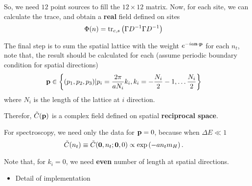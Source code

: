 So, we need $12$ point sources to fill the $12\times 12$ matrix. Now, for each site, we can calculate the trace, and obtain a \textbf{real} field defined on sites
\begin{equation}
\begin{split}
&\Phi (n) = {\rm tr}_{c,s}\left(\Gamma D^{-1}\Gamma D^{-1}\right)
\end{split}
\end{equation}

The final step is to sum the spatial lattice with the weight $e^{-ia{\bf n}\cdot {\bf p}}$ for each $n_t$, note that, the result should be calculated for each (assume periodic boundary condition for spatial directions)
\begin{equation}
\begin{split}
&{\bf p}\in \left\{(p_1,p_2,p_3)|p_i=\frac{2\pi}{a N_i}k_i, k_i=-\frac{N_i}{2}-1,\ldots \frac{N_i}{2}\right\}
\end{split}
\end{equation}
where $N_i$ is the length of the lattice at $i$ direction.

Therefor, $\tilde{C}({\bf p})$ is a complex field defined on spatial \textbf{reciprocal space}.

For spectroscopy, we need only the data for ${\bf p}=0$, because when $\Delta E\ll 1$
\begin{equation}
\begin{split}
&\tilde{C}(n_t)\equiv \tilde{C}({\bf 0},n_t;{\bf 0},0)\propto \exp \left(-a n_t m_H\right).
\end{split}
\end{equation}

Note that, for $k_i=0$, we need \textbf{even} number of length at spatial directions.

\begin{itemize}
  \item Detail of implementation
\end{itemize}

